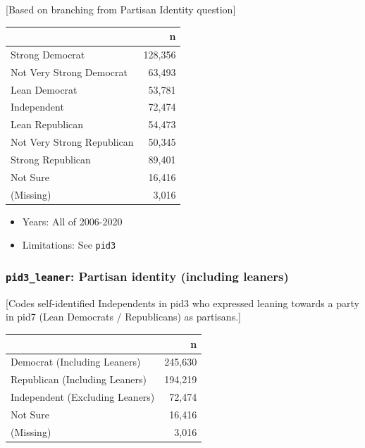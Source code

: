 \documentclass[10pt,article,oneside]{memoir}
\theoremstyle{definition}
\begin{document}
{[}Based on branching from Partisan Identity question{]}

\begin{table}[H]
\centering
\begin{tabular}{lr}
\toprule
 & n\\
\midrule
Strong Democrat & 128,356\\
Not Very Strong Democrat & 63,493\\
Lean Democrat & 53,781\\
Independent & 72,474\\
Lean Republican & 54,473\\
Not Very Strong Republican & 50,345\\
Strong Republican & 89,401\\
Not Sure & 16,416\\
(Missing) & 3,016\\
\bottomrule
\end{tabular}
\end{table}

\begin{itemize}
\tightlist
\item
  Years: All of 2006-2020
\item
  Limitations: See \texttt{pid3}
\end{itemize}

\hypertarget{pid3_leaner-partisan-identity-including-leaners}{%
\subsubsection{\texorpdfstring{\texttt{pid3\_leaner}: Partisan identity
(including
leaners)}{pid3\_leaner: Partisan identity (including leaners)}}\label{pid3_leaner-partisan-identity-including-leaners}}

{[}Codes self-identified Independents in pid3 who expressed leaning
towards a party in pid7 (Lean Democrats / Republicans) as partisans.{]}

\begin{table}[H]
\centering
\begin{tabular}{lr}
\toprule
 & n\\
\midrule
Democrat (Including Leaners) & 245,630\\
Republican (Including Leaners) & 194,219\\
Independent (Excluding Leaners) & 72,474\\
Not Sure & 16,416\\
(Missing) & 3,016\\
\bottomrule
\end{tabular}
\end{table}
\end{document}
